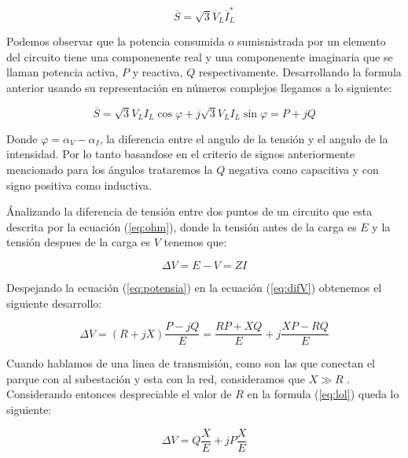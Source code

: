 \documentclass{book}
\begin{document}
\begin{equation}
	\overline{S}=\sqrt{3} \overline{V}_L  \overline{I}_L^*
\end{equation} \par

Podemos observar que la potencia consumida o sumisnistrada por un elemento del circuito tiene una componenente real y una componenente imaginaria que se llaman potencia activa, $P$ y reactiva, $Q$ respectivamente. Desarrollando la formula anterior usando su representaci\'on en n\'umeros complejos llegamos a lo siguiente: \par

\begin{equation}\label{eq:potensia}
	\overline{S}= \sqrt{3} V_L I_L \cos{\varphi}+j\sqrt{3} V_L I_L \sin{\varphi} = P+jQ 
\end{equation} \par

Donde $\varphi= \alpha_V-\alpha_I$, la diferencia entre el angulo de la tensi\'on y el angulo de la intensidad. Por lo tanto basandose en el criterio de signos anteriormente mencionado para los \'angulos trataremos la $Q$ negativa como capacitiva y con signo positiva como inductiva. \par

\'Analizando la diferencia de tensi\'on entre dos puntos de un circuito que esta descrita por la ecuaci\'on (\ref{eq:ohm}), donde la tensi\'on antes de la carga es $E$ y la tensi\'on despues de la carga es $V$ tenemos que:

\begin{equation}\label{eq:difV}
	\Delta V=E-V=ZI
\end{equation} \par

 Despejando la ecuaci\'on (\ref{eq:potensia}) en la ecuaci\'on (\ref{eq:difV}) obtenemos el siguiente desarrollo:

\begin{equation}\label{eq:lol}
	\Delta V=(R+jX)\frac{P-jQ}{E}= \frac{RP+XQ}{E}+j\frac{XP-RQ}{E}
\end{equation} \par

Cuando hablamos de una linea de transmisi\'on, como son las que conectan el parque con al subestaci\'on y esta con la red, consideramos que $X \gg R$ \cite{WFgridcode}. Considerando entonces despreciable el valor de $R$ en la formula (\ref{eq:lol}) queda lo siguiente: 

\begin{equation}
	\Delta V= Q\frac{X}{E}+jP\frac{X}{E}
\end{equation} \par
\end{document}
